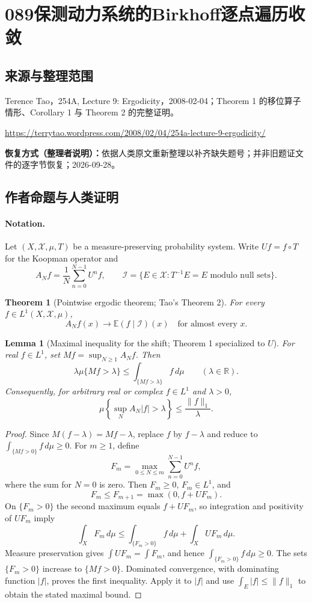 \documentclass[UTF8,11pt]{ctexart}
\newtheorem*{theorem}{Theorem}
\newtheorem*{lemma}{Lemma}
\theoremstyle{definition}
\newcommand{\R}{\mathbb R}
\newcommand{\E}{\mathbb E}
\begin{document}
\section*{089\quad 保测动力系统的Birkhoff逐点遍历收敛}
\subsection*{来源与整理范围}
Terence Tao，254A, Lecture 9: Ergodicity，2008-02-04；Theorem 1 的移位算子情形、Corollary 1 与 Theorem 2 的完整证明。
\par\url{https://terrytao.wordpress.com/2008/02/04/254a-lecture-9-ergodicity/}
\par\textbf{恢复方式（整理者说明）：}依据人类原文重新整理以补齐缺失题号；并非旧题证文件的逐字节恢复；2026-09-28。
\subsection*{作者命题与人类证明}

\paragraph{Notation.}
Let $(X,\mathcal X,\mu,T)$ be a measure-preserving probability system.
Write $Uf=f\circ T$ for the Koopman operator and
\[
 A_Nf=\frac1N\sum_{n=0}^{N-1}U^nf,
 \qquad \mathcal I=\{E\in\mathcal X:T^{-1}E=E\text{ modulo null sets}\}.
\]
\begin{theorem}[Pointwise ergodic theorem; Tao's Theorem 2]
For every $f\in L^1(X,\mathcal X,\mu)$,
\[
 A_Nf(x)\longrightarrow\E(f\mid\mathcal I)(x)
 \quad\text{for almost every }x.
\]
\end{theorem}

\begin{lemma}[Maximal inequality for the shift; Theorem 1 specialized to $U$]
For real $f\in L^1$, set $Mf=\sup_{N\geq1}A_Nf$. Then
\[
 \lambda\mu\{Mf>\lambda\}\leq\int_{\{Mf>\lambda\}}f\,d\mu
 \qquad(\lambda\in\R).
\]
Consequently, for arbitrary real or complex $f\in L^1$ and $\lambda>0$,
\[
 \mu\left\{\sup_N A_N|f|>\lambda\right\}\leq\frac{\|f\|_1}{\lambda}.
\]
\end{lemma}
\begin{proof}
Since $M(f-\lambda)=Mf-\lambda$, replace $f$ by $f-\lambda$ and reduce to
$\int_{\{Mf>0\}}f\,d\mu\geq0$. For $m\geq1$, define
\[
 F_m=\max_{0\leq N\leq m}\sum_{n=0}^{N-1}U^nf,
\]
where the sum for $N=0$ is zero. Then $F_m\geq0$, $F_m\in L^1$, and
\[
 F_m\leq F_{m+1}=\max(0,f+UF_m).
\]
On $\{F_m>0\}$ the second maximum equals $f+UF_m$, so integration and
positivity of $UF_m$ imply
\[
 \int_XF_m\,d\mu
 \leq\int_{\{F_m>0\}}f\,d\mu+\int_XUF_m\,d\mu.
\]
Measure preservation gives $\int UF_m=\int F_m$, and hence
$\int_{\{F_m>0\}}f\,d\mu\geq0$.
The sets $\{F_m>0\}$ increase to $\{Mf>0\}$. Dominated convergence,
with dominating function $|f|$, proves the first inequality. Apply it to
$|f|$ and use $\int_E|f|\leq\|f\|_1$ to obtain the stated maximal bound.
\end{proof}
\end{document}
